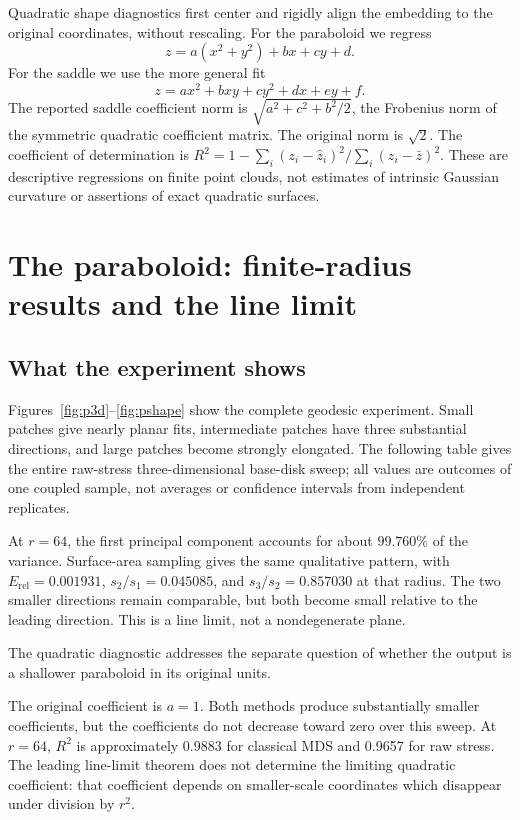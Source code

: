 \documentclass[11pt]{article}
\theoremstyle{remark}\newtheorem{remark}[proposition]{Remark}
\newcommand{\Erel}{E_{\mathrm{rel}}}
\begin{document}
Quadratic shape diagnostics first center and rigidly align the embedding to
the original coordinates, without rescaling. For the paraboloid we regress
\begin{equation}\label{eq:parab-fit}
 z=a(x^2+y^2)+bx+cy+d.
\end{equation}
For the saddle we use the more general fit
\begin{equation}\label{eq:saddle-fit}
 z=ax^2+bxy+cy^2+dx+ey+f.
\end{equation}
The reported saddle coefficient norm is $\sqrt{a^2+c^2+b^2/2}$, the Frobenius
norm of the symmetric quadratic coefficient matrix. The original norm is
$\sqrt2$. The coefficient of determination is
$R^2=1-\sum_i(z_i-\widehat z_i)^2/\sum_i(z_i-\bar z)^2$.
These are descriptive regressions on finite point clouds, not estimates of
intrinsic Gaussian curvature or assertions of exact quadratic surfaces.

\section{The paraboloid: finite-radius results and the line limit}\label{sec:paraboloid}

\subsection{What the experiment shows}
Figures~\ref{fig:p3d}--\ref{fig:pshape} show the complete geodesic experiment.
Small patches give nearly planar fits, intermediate patches have three
substantial directions, and large patches become strongly elongated. The
following table gives the entire raw-stress three-dimensional base-disk sweep;
all values are outcomes of one coupled sample, not averages or confidence
intervals from independent replicates.


At $r=64$, the first principal component accounts for about $99.760\%$ of the
variance. Surface-area sampling gives the same qualitative pattern, with
$\Erel=0.001931$, $s_2/s_1=0.045085$, and $s_3/s_2=0.857030$ at that radius.
The two smaller directions remain comparable, but both become small relative
to the leading direction. This is a line limit, not a nondegenerate plane.

The quadratic diagnostic addresses the separate question of whether the
output is a shallower paraboloid in its original units.

The original coefficient is $a=1$. Both methods produce substantially smaller
coefficients, but the coefficients do not decrease toward zero over this
sweep. At $r=64$, $R^2$ is approximately 0.9883 for classical MDS and 0.9657 for
raw stress. The leading line-limit theorem does not determine the limiting
quadratic coefficient: that coefficient depends on smaller-scale coordinates
which disappear under division by $r^2$.
\end{document}
